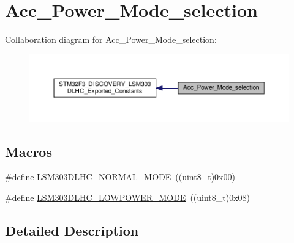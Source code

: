 \hypertarget{group__Acc__Power__Mode__selection}{\section{Acc\+\_\+\+Power\+\_\+\+Mode\+\_\+selection}
\label{group__Acc__Power__Mode__selection}
}
Collaboration diagram for Acc\+\_\+\+Power\+\_\+\+Mode\+\_\+selection\+:\nopagebreak
\begin{figure}[H]
\begin{center}
\leavevmode
\includegraphics[width=350pt]{group__Acc__Power__Mode__selection}
\end{center}
\end{figure}
\subsection*{Macros}
\begin{DoxyCompactItemize}
\item 
\#define \hyperlink{group__Acc__Power__Mode__selection_ga1b998f7fe108e2e8eeef05e3050fccb7}{L\+S\+M303\+D\+L\+H\+C\+\_\+\+N\+O\+R\+M\+A\+L\+\_\+\+M\+O\+D\+E}~((uint8\+\_\+t)0x00)
\item 
\#define \hyperlink{group__Acc__Power__Mode__selection_ga192812a776b0741c596c6ed7dda783bd}{L\+S\+M303\+D\+L\+H\+C\+\_\+\+L\+O\+W\+P\+O\+W\+E\+R\+\_\+\+M\+O\+D\+E}~((uint8\+\_\+t)0x08)
\end{DoxyCompactItemize}


\subsection{Detailed Description}


